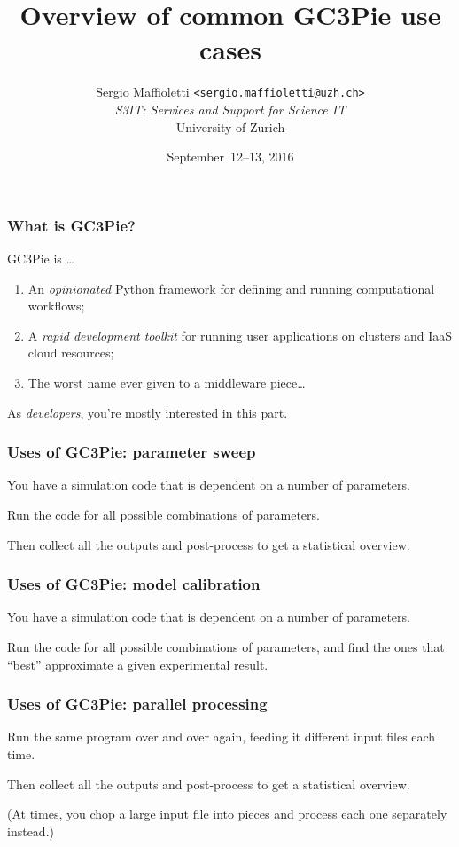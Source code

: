\documentclass[english,serif,mathserif,xcolor=pdftex,dvipsnames,table]{beamer}
\title[Introduction]{%
  Overview of common GC3Pie use cases
}
\author[S. Maffioletti, S3IT UZH]{%
  Sergio Maffioletti \texttt{<sergio.maffioletti@uzh.ch>}
  \\[1ex]
  \emph{S3IT: Services and Support for Science IT}
  \\[1ex]
  University of Zurich
}
\date{September~12--13, 2016}
\begin{document}
\maketitle

\begin{frame}
  \frametitle{What is GC3Pie?}
  GC3Pie is \ldots
  \begin{enumerate}
  \item \alert<1>{An \emph{opinionated} Python framework for defining and running computational workflows;}
  \item A \emph{rapid development toolkit} for running user applications on clusters and IaaS cloud resources;
  \item The worst name ever given to a middleware piece\ldots
  \end{enumerate}

  \+
  As \emph{developers}, \alert<1>{you're mostly interested in this part.}
\end{frame}


\begin{frame}[fragile]
  \frametitle{Uses of GC3Pie: parameter sweep}

  You have a simulation code that is dependent on a number of parameters.

  \+
  Run the code for all possible combinations of parameters.

  \+
  Then collect all the outputs and post-process to get a
  statistical overview.
\end{frame}


\begin{frame}[fragile]
  \frametitle{Uses of GC3Pie: model calibration}

  You have a simulation code that is dependent on a number of parameters.

  \+
  Run the code for all possible combinations of parameters, and
  find the ones that ``best'' approximate a given experimental result.
\end{frame}


\begin{frame}[fragile]
  \frametitle{Uses of GC3Pie: parallel processing}

  Run the same program over and over again,
  feeding it different input files each time.

  \+
  Then collect all the outputs and post-process to get a
  statistical overview.

  \+  (At times, you chop a large input file into pieces and process each one separately instead.)

\end{frame}
\end{document}
